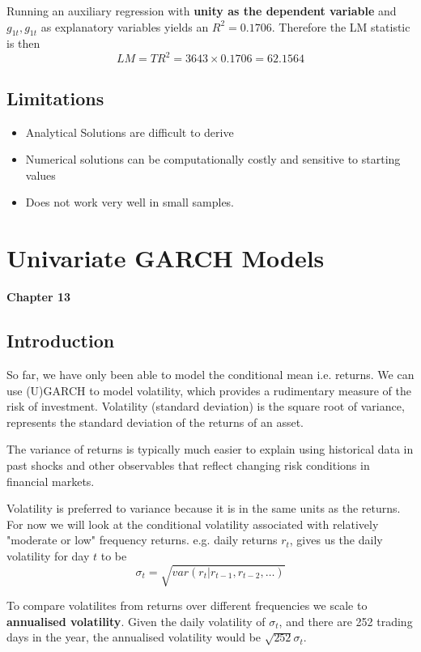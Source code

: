 \documentclass[11pt]{article}
\begin{document}
Running an auxiliary regression with \textbf{unity as the dependent variable} and $g_{1t}, g_{1t}$ as explanatory variables yields an $R^2=0.1706$. Therefore the LM statistic is then
\[LM = TR^2 = 3643\times 0.1706 = 62.1564\]



\begin{shaded}
    \subsection{Limitations}
    \begin{itemize}
        \item Analytical Solutions are difficult to derive
        \item Numerical solutions can be computationally costly and sensitive to starting values
        \item Does not work very well in small samples.
    \end{itemize}
\end{shaded}




\newpage
\section{Univariate GARCH Models}
\textbf{Chapter 13}

\subsection{Introduction}

So far, we have only been able to model the conditional mean i.e. returns. We can use (U)GARCH to model volatility, which provides a rudimentary measure of the risk of investment. Volatility (standard deviation) is the square root of variance, represents the standard deviation of the returns of an asset.

The variance of returns is typically much easier to explain using historical data in past shocks and other observables that reflect changing risk conditions in financial markets.

Volatility is preferred to variance because it is in the same units as the returns. For now we will look at the conditional volatility associated with relatively "moderate or low" frequency returns. e.g. daily returns $r_t$, gives us the daily volatility for day $t$ to be
\[\sigma_t = \sqrt{var(r_t|r_{t-1}, r_{t-2}, \ldots)}\]

To compare volatilites from returns over different frequencies we scale to \textbf{annualised volatility}. Given the daily volatility of $\sigma_t$, and there are 252 trading days in the year, the annualised volatility would be $\sqrt{252} \sigma_t$.
\end{document}
